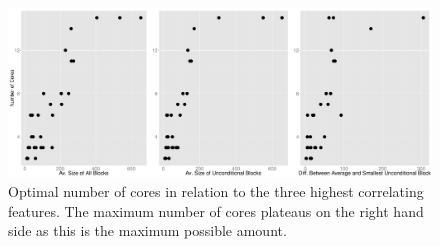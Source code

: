 \begin{figure}
  \center
  \includegraphics[width=1\textwidth]{streamit-paper/graphics/lineargraphs.pdf}
  \caption{Optimal number of cores in relation to the three highest correlating features. The maximum number of cores plateaus on the right hand side as this is the maximum possible amount.}\label{fig:maxav}
\end{figure}
